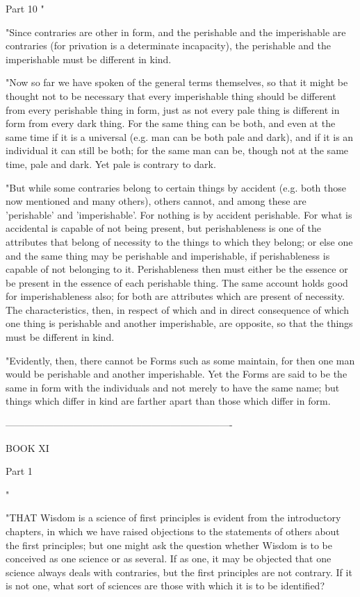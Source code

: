 Part 10 "

"Since contraries are other in form, and the perishable and the imperishable
are contraries (for privation is a determinate incapacity), the perishable
and the imperishable must be different in kind. 

"Now so far we have spoken of the general terms themselves, so that
it might be thought not to be necessary that every imperishable thing
should be different from every perishable thing in form, just as not
every pale thing is different in form from every dark thing. For the
same thing can be both, and even at the same time if it is a universal
(e.g. man can be both pale and dark), and if it is an individual it
can still be both; for the same man can be, though not at the same
time, pale and dark. Yet pale is contrary to dark. 

"But while some contraries belong to certain things by accident (e.g.
both those now mentioned and many others), others cannot, and among
these are 'perishable' and 'imperishable'. For nothing is by accident
perishable. For what is accidental is capable of not being present,
but perishableness is one of the attributes that belong of necessity
to the things to which they belong; or else one and the same thing
may be perishable and imperishable, if perishableness is capable of
not belonging to it. Perishableness then must either be the essence
or be present in the essence of each perishable thing. The same account
holds good for imperishableness also; for both are attributes which
are present of necessity. The characteristics, then, in respect of
which and in direct consequence of which one thing is perishable and
another imperishable, are opposite, so that the things must be different
in kind. 

"Evidently, then, there cannot be Forms such as some maintain, for
then one man would be perishable and another imperishable. Yet the
Forms are said to be the same in form with the individuals and not
merely to have the same name; but things which differ in kind are
farther apart than those which differ in form. 

----------------------------------------------------------------------

BOOK XI

Part 1 

"

"THAT Wisdom is a science of first principles is evident from the
introductory chapters, in which we have raised objections to the statements
of others about the first principles; but one might ask the question
whether Wisdom is to be conceived as one science or as several. If
as one, it may be objected that one science always deals with contraries,
but the first principles are not contrary. If it is not one, what
sort of sciences are those with which it is to be identified?

